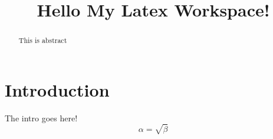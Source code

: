\documentclass{article}
\begin{document}
\title{Hello My Latex Workspace!}
\maketitle
\begin{abstract}
This is abstract
\end{abstract}
\section{Introduction}
The intro goes here!
\begin{equation}
\alpha=\sqrt{\beta}
\end{equation}
\end{document}

